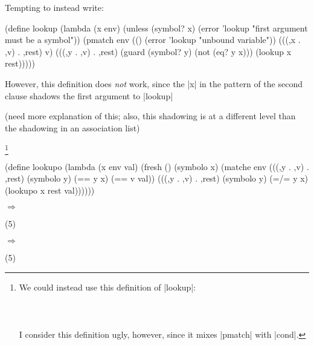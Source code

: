 Tempting to instead write:

\begin{schemedisplay}
(define lookup
  (lambda (x env)
    (unless (symbol? x)
      (error 'lookup "first argument must be a symbol"))
    (pmatch env
      (() (error 'lookup "unbound variable"))
      (((,x . ,v) . ,rest)
       v)
      (((,y . ,v) . ,rest) (guard (symbol? y) (not (eq? y x)))
       (lookup x rest)))))
\end{schemedisplay}

However, this definition does \emph{not} work, since the \scheme|x| in
the pattern of the second clause shadows the first argument to
\scheme|lookup|

(need more explanation of this; also, this shadowing is at a different
level than the shadowing in an association list)


\setbox\boxa{}

\footnote{We could instead use this definition of \scheme|lookup|: \\ \ \\ \usebox{\boxa} \\ \ \\ I consider this definition ugly, however, since it mixes \scheme|pmatch| with \scheme|cond|.}





\begin{schemedisplay}
(define lookupo
  (lambda (x env val)
    (fresh ()
      (symbolo x)
      (matche env
        (((,y . ,v) . ,rest) (symbolo y)
         (== y x) (== v val))
        (((,y . ,v) . ,rest) (symbolo y)
         (=/= y x) (lookupo x rest val))))))
\end{schemedisplay}

\noindent{} $\Rightarrow$
\begin{schemeresponsebox}(5)\end{schemeresponsebox}

\noindent{} $\Rightarrow$
\begin{schemeresponsebox}(5)\end{schemeresponsebox}

